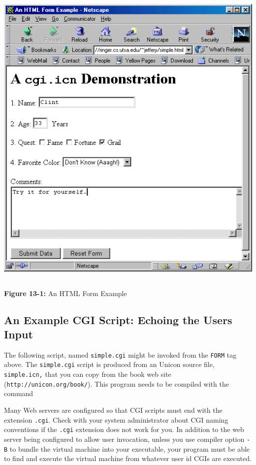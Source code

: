 {\begin{center}
\includegraphics[width=5.5516in,height=5.989in]{ub-img/ub-img44.png}
\end{center}

{\sffamily\bfseries Figure 13-1:}
{\sffamily An HTML Form Example}

\subsection{An Example CGI Script: Echoing the User{\textquotesingle}s
Input}

The following script, named \texttt{simple.cgi} might be invoked from
the \texttt{FORM} tag above. The \texttt{simple.cgi} script is produced
from an Unicon source file, \texttt{simple.icn}\texttt{,} that you can
copy from the book web site
(\texttt{http://unicon.org/book/}). This program needs to
be compiled with the command


Many Web servers are configured so that CGI scripts must end with the
extension \texttt{.cgi}. Check with your system administrator about CGI
naming conventions if the \texttt{.cgi} extension does not work for
you. In addition to the web server being configured to allow user
invocation, unless you use compiler option \texttt{{}-B} to bundle the
virtual machine into your executable, your program must be able to find
and execute the virtual machine from whatever user id
CGI{\textquotesingle}s are executed.

}
